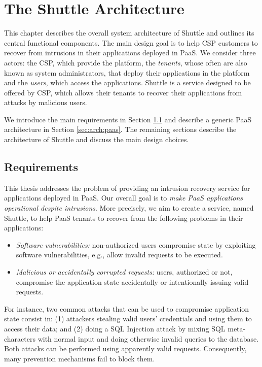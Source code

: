 
\chapter{The Shuttle Architecture}
\label{chapter:architecture}
This chapter describes the overall system architecture of Shuttle and outlines its central functional components. The main design goal is to help \acf{CSP} customers to recover from intrusions in their applications deployed in \acf{PaaS}. We consider three actors: the \acf{CSP}, which provide the platform, the \emph{tenants}, whose often are also known as system administrators, that deploy their applications in the platform and the \emph{users}, which access the applications. Shuttle is a service designed to be offered by \ac{CSP}, which allows their tenants to recover their applications from attacks by malicious users. 

We introduce the main requirements in Section \ref{sec:arch:requirements} and describe a generic \acf{PaaS} architecture in Section \ref{sec:arch:paas}. The remaining sections describe the architecture of Shuttle and discuss the main design choices.\\

\section{Requirements}
\label{sec:arch:requirements}
This thesis addresses the problem of providing an intrusion recovery service for applications deployed in \acf{PaaS}. Our overall goal is to \textit{make \ac{PaaS} applications operational despite intrusions}. More precisely, we aim to create a service, named Shuttle, to help \ac{PaaS} tenants to recover from the following problems in their applications:
\begin{itemize}
\item \textit{Software vulnerabilities:} non-authorized users compromise state by exploiting software vulnerabilities, e.g., allow invalid requests to be executed.
\item \textit{Malicious or accidentally corrupted requests:} users, authorized or not, compromise the application state accidentally or intentionally issuing valid requests.
\end{itemize} 




For instance, two common attacks that can be used to compromise application state consist in: (1) attackers stealing valid users' credentials and using them to access their data; and (2) doing a \ac{SQL} Injection attack by mixing \ac{SQL} meta-characters with normal input and doing otherwise invalid queries to the database. Both attacks can be performed using apparently valid requests. Consequently, many prevention mechanisms fail to block them.

